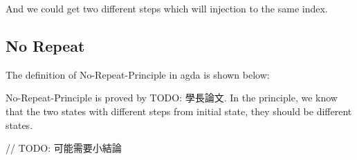 And we could get two different steps which will injection to the same index.

\subsection{ No Repeat }
The definition of No-Repeat-Principle in agda is shown below:

No-Repeat-Principle is proved by {TODO: 學長論文}.  In the principle, we know that the two states with different steps from initial state, they should be different states.


// TODO: 可能需要小結論

